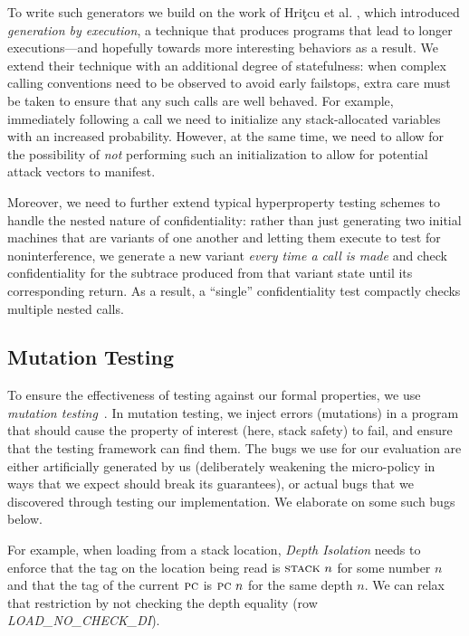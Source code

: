 \documentclass[10pt,conference]{ieeetran}%
\theoremstyle{definition}
\begin{document}
To write such generators we build on the work of Hri\c{t}cu et
al. \cite{TestingNI:ICFP, DBLP:journals/jfp/HritcuLSADHPV16}, which
introduced {\em generation by execution}, a technique that produces
programs that lead to longer executions---and hopefully towards more
interesting behaviors as a result. We extend their technique with an additional
degree of statefulness: when complex calling conventions need to be
observed to avoid early failstops, extra care must be taken to ensure
that any such calls are well behaved. For example, immediately
following a call we need to initialize any stack-allocated variables
with an increased probability. However, at the same time, we need to
allow for the possibility of {\em not} performing such an initialization
to allow for potential attack vectors to manifest.

Moreover, we need to further extend typical hyperproperty testing
schemes to handle the nested nature of confidentiality: rather than
just generating two initial machines that are variants of one another
and letting them execute to test for noninterference, we generate a
new variant {\em every time a call is made} and check confidentiality
for the subtrace produced from that variant state until its
corresponding return. As a result, a ``single'' confidentiality test
compactly checks multiple nested calls.


\subsection{Mutation Testing}

To ensure the effectiveness of testing against our formal properties, we
use {\em mutation testing}~\cite{JiaH11}. In mutation testing, we inject errors
(mutations) in a program that should cause the property of interest (here,
stack safety) to fail, and ensure that the testing framework can find
them. The bugs we use for our evaluation are either artificially generated
by us (deliberately weakening the micro-policy in ways that we expect
should break its guarantees), or actual bugs that we discovered through
testing our implementation. We elaborate on some such bugs below.

For example, when loading from a stack location, {\em Depth Isolation}
needs to enforce that the tag on the location being read
is $\textsc{stack} ~ n$ for some number $n$ and that the tag of the
current $\textsc{pc}$ is $\textsc{pc} ~ n$ for the same depth $n$. We can relax
that restriction by not checking the depth equality (row {\em
  LOAD\_NO\_CHECK\_DI}).
\end{document}
